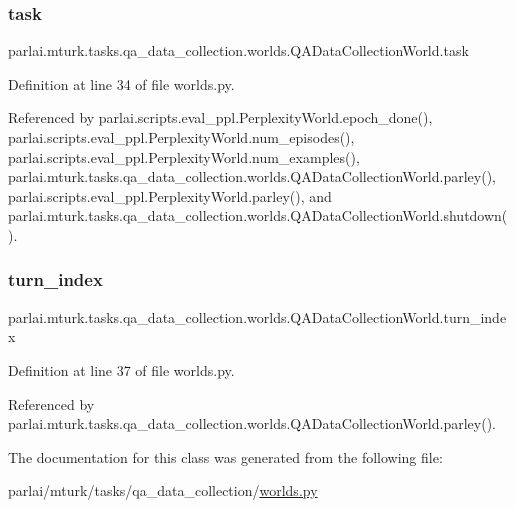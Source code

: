\subsubsection{\texorpdfstring{task}{task}}
{\footnotesize\ttfamily parlai.\+mturk.\+tasks.\+qa\+\_\+data\+\_\+collection.\+worlds.\+Q\+A\+Data\+Collection\+World.\+task}



Definition at line 34 of file worlds.\+py.



Referenced by parlai.\+scripts.\+eval\+\_\+ppl.\+Perplexity\+World.\+epoch\+\_\+done(), parlai.\+scripts.\+eval\+\_\+ppl.\+Perplexity\+World.\+num\+\_\+episodes(), parlai.\+scripts.\+eval\+\_\+ppl.\+Perplexity\+World.\+num\+\_\+examples(), parlai.\+mturk.\+tasks.\+qa\+\_\+data\+\_\+collection.\+worlds.\+Q\+A\+Data\+Collection\+World.\+parley(), parlai.\+scripts.\+eval\+\_\+ppl.\+Perplexity\+World.\+parley(), and parlai.\+mturk.\+tasks.\+qa\+\_\+data\+\_\+collection.\+worlds.\+Q\+A\+Data\+Collection\+World.\+shutdown().

\mbox{\label{classparlai_1_1mturk_1_1tasks_1_1qa__data__collection_1_1worlds_1_1QADataCollectionWorld_abff243d566705bf676a2f0a4f0fce0aa}} 
\subsubsection{\texorpdfstring{turn\+\_\+index}{turn\_index}}
{\footnotesize\ttfamily parlai.\+mturk.\+tasks.\+qa\+\_\+data\+\_\+collection.\+worlds.\+Q\+A\+Data\+Collection\+World.\+turn\+\_\+index}



Definition at line 37 of file worlds.\+py.



Referenced by parlai.\+mturk.\+tasks.\+qa\+\_\+data\+\_\+collection.\+worlds.\+Q\+A\+Data\+Collection\+World.\+parley().



The documentation for this class was generated from the following file\+:\begin{DoxyCompactItemize}
\item 
parlai/mturk/tasks/qa\+\_\+data\+\_\+collection/\hyperlink{parlai_2mturk_2tasks_2qa__data__collection_2worlds_8py}{worlds.\+py}\end{DoxyCompactItemize}
